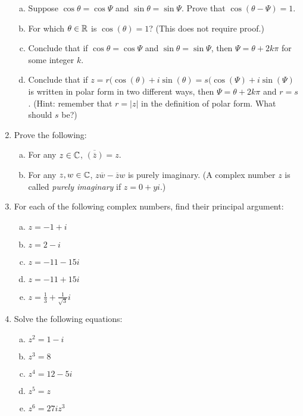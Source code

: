 \begin{enumerate}
\begin{enumerate}[a)] \item Suppose $\cos \theta = \cos \Psi$ and $\sin \theta = \sin \Psi$. Prove that $\cos(\theta - \Psi) = 1$.

\item For which $\theta \in \mathbb{R}$ is $\cos(\theta) = 1$? (This does not require proof.)

\item Conclude that if  $\cos \theta = \cos \Psi$ and $\sin \theta = \sin \Psi$, then $\Psi = \theta + 2k\pi$ for some integer $k$.

\item Conclude that if $z = r(\cos(\theta) + i\sin(\theta) = s(\cos(\Psi) + i \sin(\Psi)$ is written in polar form in two different ways, then $\Psi = \theta + 2k\pi$ and $r = s$. (Hint: remember that $r = |z|$ in the definition of polar form. What should $s$ be?)

\end{enumerate}

\item Prove the following:

\begin{enumerate}[a)]
\item For any $z \in \mathbb{C}$, $\overline{(\overline{z})} = z$.
\item For any $z,w \in \mathbb{C}$, $z\overline{w} - \overline{z}w$ is purely imaginary. (A complex number $z$ is called \textit{purely imaginary} if $z = 0 + yi$.)
\end{enumerate}

\item For each of the following complex numbers, find their principal argument:

\begin{enumerate}[a)]
\item $z = -1 + i$
\item $z = 2 - i$
\item $z = -11 - 15i$
\item $z = -11 + 15i$
\item $z = \frac{1}{3} + \frac{1}{\sqrt{3}}i$
\end{enumerate}


\item Solve the following equations:

\begin{enumerate}[a)]
\item $z^2 = 1 - i$
\item $z^3 = 8$
\item $z^4 = 12 - 5i$
\item $z^5 = z$
\item $z^6 = 27iz^3$
\end{enumerate}



\end{enumerate}
